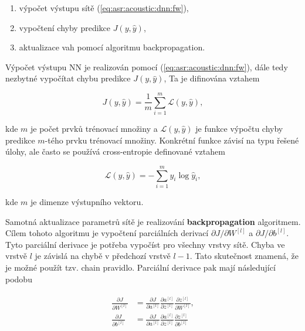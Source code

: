 \begin{enumerate}
  \item výpočet výstupu sítě (\ref{eq:asr:acoustic:dnn:fw}),
  \item vypočtení chyby predikce $J\left(y, \hat{y}\right)$,
  \item aktualizace vah pomocí algoritmu backpropagation.
\end{enumerate}

\noindent Výpočet výstupu NN je realizován pomocí (\ref{eq:asr:acoustic:dnn:fw}), dále tedy nezbytné vypočítat chybu predikce $J\left(y, \hat{y}\right)$, Ta je difinována vztahem

\begin{equation}
  J\left(y, \hat{y}\right) = \frac{1}{m} \sum_{i=1}^{m}\mathcal{L}\left(y, \hat{y}\right),
  \label{eq:asr:acoustic:dnn:cost}
\end{equation}

\noindent kde $m$ je počet prvků trénovací množiny a $\mathcal{L}\left(y, \hat{y}\right)$ je funkce výpočtu chyby predikce $m$-tého prvku trénovací množiny. Konkrétní funkce závisí na typu řešené úlohy, ale často se používá cross-entropie definované vztahem

\begin{equation}
  \mathcal{L}\left(y, \hat{y}\right) = - \sum_{i=1}^{m} y_i \log \hat{y}_i,
  \label{eq:asr:acoustic:dnn:cost}
\end{equation}

\noindent kde $m$ je dimenze výstupního vektoru.

Samotná aktualizace parametrů sítě je realizování \textbf{backpropagation} algoritmem. Cílem tohoto algoritmu je vypočtení parciálních derivací $\partial J / \partial W^{[l]}$ a $\partial J/\partial b^{[l]}$. Tyto parciální derivace je potřeba vypočíst pro všechny vrstvy sítě. Chyba ve vrstvě $l$ je závislá na chybě v předchozí vrstvě $l-1$. Tato skutečnost znamená, že je možné použít tzv. chain pravidlo. Parciální derivace pak mají následující podobu

\begin{align}
  \begin{split}
    \frac{\partial J}{\partial W^{[l]}} & = \frac{\partial J}{\partial a^{[l]}} \frac{\partial a^{[l]}}{\partial z^{[l]}} \frac{\partial z^{[l]}}{\partial W^{[l]}}, \\
    \frac{\partial J}{\partial b^{[l]}} & = \frac{\partial J}{\partial a^{[l]}} \frac{\partial a^{[l]}}{\partial z^{[l]}} \frac{\partial z^{[l]}}{\partial b^{[l]}}
  \end{split}
  \label{eq:asr:acoustic:dnn:partial}
\end{align}

